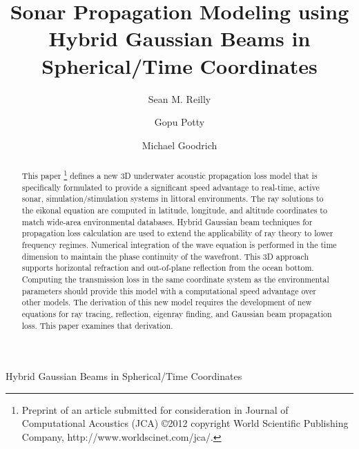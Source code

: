 \documentclass{ws-jca}
\newcommand{\threeD}{3\nobreakdash\textendash D }	%
\begin{document}
{Hybrid Gaussian Beams in Spherical/Time Coordinates}

%
\catchline{}{}{}{}{}
%

\title{Sonar Propagation Modeling using Hybrid Gaussian Beams in Spherical/Time Coordinates}

\author{Sean M. Reilly}
\address{Department of Ocean Engineering, University of Rhode Island,\\
Narragansett RI, USA\\
 }

\author{Gopu Potty}
\address{Department of Ocean Engineering, University of Rhode Island,\\
Narragansett RI, USA\\
 }

\author{Michael Goodrich}
\address{Alion Science and Tecnology Corporation,\\
Norfolk VA, USA\\
 }

\maketitle

\begin{history}
\end{history}

\begin{abstract}
This paper \footnote{Preprint of an article submitted for consideration in Journal of Computational Acoustics (JCA) 
\copyright 2012 copyright World Scientific Publishing Company, http://www.worldscinet.com/jca/.}
defines a new \threeD underwater acoustic propagation loss model that is
specifically formulated to provide a significant speed advantage to real-time, active sonar, simulation/stimulation systems in littoral environments.  The ray
solutions to the eikonal equation are computed in latitude, longitude, and
altitude coordinates to match wide-area environmental databases. Hybrid
Gaussian beam techniques for propagation loss calculation are used to
extend the applicability of ray theory to lower frequency regimes.
Numerical integration of the wave equation is performed in the time
dimension to maintain the phase continuity of the wavefront. This \threeD
approach supports horizontal refraction and 
out-of-plane reflection from the ocean bottom. 
Computing the transmission loss in the same coordinate system as the
environmental parameters should provide this model with a computational
speed advantage over other models. The derivation of this new model
requires the development of new equations for ray tracing, reflection,
eigenray finding, and Gaussian beam propagation loss. This paper examines
that derivation.
\end{abstract}
\end{document}
